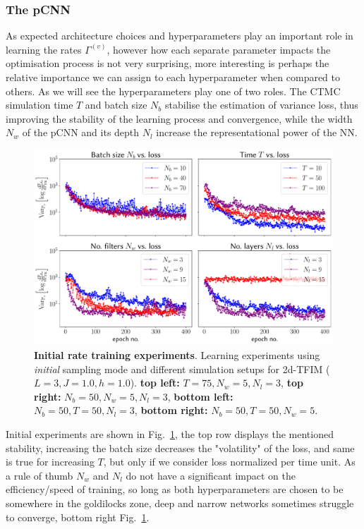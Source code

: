 \subsubsection{The pCNN}
As expected architecture choices and hyperparameters play an important role in learning the rates $\Gamma^{(v)}$, however how each separate parameter impacts the optimisation process is not very surprising, more interesting is perhaps the relative importance we can assign to each hyperparameter when compared to others. As we will see the hyperparameters play one of two roles. The CTMC simulation time $T$ and batch size $N_b$ stabilise the estimation of variance loss, thus improving the stability of the learning process and convergence, while the width $N_w$ of the pCNN and its depth $N_l$ increase the representational power of the NN.
\begin{figure}[H]
	\centering
	\includegraphics[width=\linewidth]{Chapter5/Figs/Vector/init_test_learning}
	\caption[Initial rate training experiments]{\textbf{Initial rate training experiments}. Learning experiments using \emph{initial} sampling mode and different simulation setups for 2d-TFIM ($L=3, J=1.0, h=1.0$). \textbf{top left:} $T = 75, N_w = 5, N_l = 3$, \textbf{top right:} $N_b = 50, N_w = 5, N_l = 3$, \textbf{bottom left:} $N_b = 50, T = 50, N_l = 3$, \textbf{bottom right:} $N_b = 50, T = 50, N_w = 5$.}
	\label{fig:inittestlearning}
\end{figure}
Initial experiments are shown in Fig.~\ref{fig:inittestlearning}, the top row displays the mentioned stability, increasing the batch size decreases the "volatility" of the loss, and same is true for increasing $T$, but only if we consider loss normalized per time unit. As a rule of thumb $N_w$ and $N_l$ do not have a significant impact on the efficiency/speed of training, so long as both hyperparameters are chosen to be somewhere in the goldilocks zone, deep and narrow networks sometimes struggle to converge, bottom right Fig.~\ref{fig:inittestlearning}.

